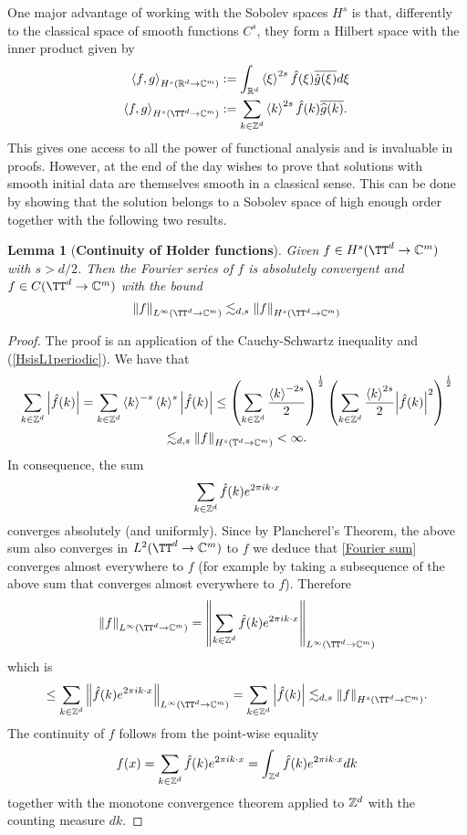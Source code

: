 \documentclass[12pt]{article}
\newtheorem{lemma}{Lemma}
\newcommand{\br}[1]{\left\langle#1\right\rangle}
\begin{document}
One major advantage of working with the Sobolev spaces $H^s$ is that, differently to the classical space of smooth functions $C^s$, they form a Hilbert space with the inner product given by
\begin{align*}
	\br{f,g}_{H^s(\R^d\to\C^m)}  & :=\int_{\R^d}\br{\xi }^{2s}\hat{f}(\xi )\overline{\hat{g}(\xi )} d\xi \\
	\br{f,g}_{H^s(\TT^d\to\C^m)} & :=\sum_{k\in \Z^d} \br{k }^{2s}\hat{f}(k)\overline{\widehat{g}(k )}.
\end{align*}
This gives one access to all the power of functional analysis and is invaluable in proofs. However,  at the end of the day wishes to prove that solutions with smooth initial data are themselves smooth in a classical sense. This can be done by showing that the solution belongs to a Sobolev space of high enough order together with the following two results.
\begin{lemma}[\textbf{Continuity of Holder functions}]
	Given $f\in H^{s}(\TT^d\to\C^m)$ with $s>d/2$. Then the Fourier series of $f$ is absolutely convergent and $f\in C(\TT^d\to\C^m)$ with the bound
	\[\norm{f}_{L^\infty(\TT^d\to\C^m)}\lesssim_{d,s}\norm{f}_{H^s(\TT^d\to\C^m)}\]
\end{lemma}
\begin{proof}
	The proof is an application of the Cauchy-Schwartz inequality and (\ref{HsisL1periodic}). We have that
	\begin{multline*}
		\sum_{k\in\Z^d}\abs{\hat{f}(k)}=\sum_{k\in\Z^d} \br{k}^{-s}\br{k}^{s}\abs{\hat{f}(k)}\leq\left(\sum_{k\in\Z^d} \frac{\br{k}^{-2s}}{2}\right)^{\frac{1}{2}}\left(\sum_{k\in\Z^d}\frac{\br{k}^{2s}}{2}\abs{\hat{f}(k)}^2\right)^{\frac{1}{2}}\\
		\lesssim_{d,s}\norm{f}_{H^s(\mathbb{T}^d\to\C^m)}<\infty.
	\end{multline*}
	In consequence, the sum
	\begin{equation}\label{Fourier sum}
		\sum_{k\in{\mathbb Z}^d}\hat{f}(k)e^{2\pi ik\cdot x}
	\end{equation}
	converges absolutely (and uniformly). Since by Plancherel's Theorem, the above sum also converges in $L^2(\TT^d\to\C^m)$ to $f$ we deduce that \eqref{Fourier sum} converges almost everywhere to $f$ (for example by taking a subsequence of the above sum that converges almost everywhere to $f$). Therefore
	\[\norm{f}_{L^\infty(\TT^d\to\C^m)}=\norm{\sum_{k\in\Z^d}\hat{f}(k)e^{2\pi ik\cdot x}}_{L^\infty(\TT^d\to\C^m)}\]
	which is
	\[\leq\sum_{k\in\Z^d}\norm{\hat{f}(k)e^{2\pi ik\cdot x}}_{L^\infty(\TT^d\to\C^m)}=\sum_{k\in\Z^d}\abs{\hat{f}(k)}\lesssim_{d,s}\norm{f}_{H^s(\TT^d\to\C^m)}.\]
	The continuity of $f$ follows from the point-wise equality
	\begin{equation}\label{pointwise convergence Fourier sum}
		f(x)=\sum_{k\in{\mathbb Z}^d}\hat{f}(k)e^{2\pi ik\cdot x}=\int_{{\mathbb Z}^d} \hat{f}(k)e^{2\pi ik\cdot x} dk
	\end{equation}
	together with the monotone convergence theorem applied to ${\mathbb Z}^d$ with the counting measure $dk$.
\end{proof}
\end{document}
